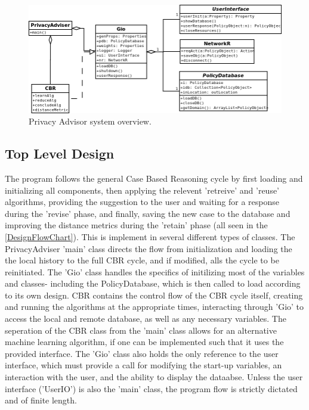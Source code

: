 \begin{figure}[htbp]
\begin{center}
\includegraphics[width = \textwidth]{DesignReport/uml/main_2.png}
\caption{Privacy Advisor system overview.}
\label{overviewFig}
\end{center}
\end{figure}


\subsection{Top Level Design}
The program follows the general Case Based Reasoning cycle by first loading and initializing all components, then applying the relevent 'retreive' and 'reuse' algorithms, providing the suggestion to the user and waiting for a response during the 'revise' phase, and finally, saving the new case to the database and improving the distance metrics during the 'retain' phase (all seen in the \ref{DesignFlowChart}).
This is implement in several different types of classes. The PrivacyAdviser 'main' class directs the flow from initialization and loading the the local history to the full CBR cycle, and if modified, alls the cycle to be reinitiated. The 'Gio' class handles the specifics of initilizing most of the variables and classes- including the PolicyDatabase, which is then called to load according to its own design. CBR contains the control flow of the CBR cycle itself, creating and running the algorithms at the appropriate times, interacting through 'Gio' to access the local and remote database, as well as any necessary variables. The seperation of the CBR class from the 'main' class allows for an alternative machine learning algorithm, if one can be implemented such that it uses the provided interface. The 'Gio' class also holds the only reference to the user interface, which must provide a call for modifying the start-up variables, an interaction with the user, and the ability to display the dataabse. Unless the user interface ('UserIO') is also the 'main' class, the program flow is strictly dictated and of finite length.

